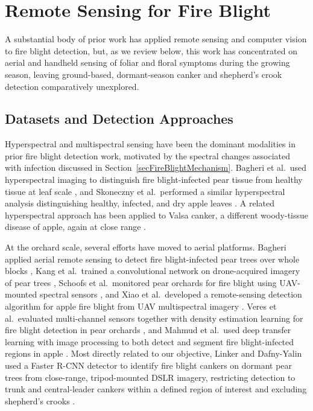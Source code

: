 \section{Remote Sensing for Fire Blight} \label{secCurrentEfforts}

A substantial body of prior work has applied remote sensing and computer
vision to fire blight detection, but, as we review below, this work has
concentrated on aerial and handheld sensing of foliar and floral symptoms
during the growing season, leaving ground-based, dormant-season canker and
shepherd's crook detection comparatively unexplored.

\subsection{Datasets and Detection Approaches} \label{secCurrentEffortsDatasets}

Hyperspectral and multispectral sensing have been the dominant modalities in
prior fire blight detection work, motivated by the spectral changes associated
with infection discussed in Section~\ref{secFireBlightMechanism}.
Bagheri et al.\ used hyperspectral imaging to distinguish fire blight-infected
pear tissue from healthy tissue at leaf scale
\cite{Bagheri2018DetectionFireBlightPearHyperspectral}, and Skoneczny et al.\
performed a similar hyperspectral analysis distinguishing healthy, infected,
and dry apple leaves
\cite{Skoneczny2020DetectionFireBlightAppleHyperspectralLeaf}.
A related hyperspectral approach has been applied to Valsa canker, a different
woody-tissue disease of apple, again at close range
\cite{Kurihara2022DetectionValsaCankerHyperspectralCanker}.

At the orchard scale, several efforts have moved to aerial platforms.
Bagheri applied aerial remote sensing to detect fire blight-infected pear
trees over whole blocks \cite{Bagheri2020AerialDetectionFireBlightPear}, Kang
et al.\ trained a convolutional network on drone-acquired imagery of pear
trees \cite{kang2020DroneDetectionFireBlightPear}, Schoofs et al.\ monitored
pear orchards for fire blight using UAV-mounted spectral sensors
\cite{schoofs2020UAVFireBlightPearSpectral}, and Xiao et al.\ developed a
remote-sensing detection algorithm for apple fire blight from UAV
multispectral imagery \cite{Xiao2022UAVFireBlightAppleMultispectral}.
Veres et al.\ evaluated multi-channel sensors together with density estimation
learning for fire blight detection in pear orchards
\cite{veres2024DetectionFireBlightPearMultiChannel}, and Mahmud et al.\ used
deep transfer learning with image processing to both detect and segment fire
blight-infected regions in apple \cite{Mahmud2023MaskRCNNFireBlight}.
Most directly related to our objective, Linker and Dafny-Yalin used a Faster
R-CNN detector to identify fire blight cankers on dormant pear trees from
close-range, tripod-mounted DSLR imagery, restricting detection to trunk and
central-leader cankers within a defined region of interest and excluding
shepherd's crooks \cite{Linker2024MappingFireBlightCankersFRCNN}.

